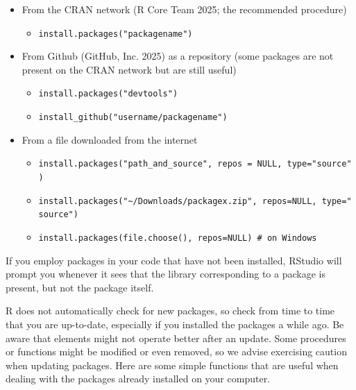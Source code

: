 \begin{itemize}
\tightlist
\item
  From the CRAN network (R Core Team 2025; the recommended procedure)

  \begin{itemize}
  \tightlist
  \item
    \texttt{install.packages("packagename")}
  \end{itemize}
\item
  From Github (GitHub, Inc. 2025) as a repository (some packages are not present on the CRAN network but are still useful)

  \begin{itemize}
  \tightlist
  \item
    \texttt{install.packages("devtools")}
  \item
    \texttt{install\_github("username/packagename")}
  \end{itemize}
\item
  From a file downloaded from the internet

  \begin{itemize}
  \tightlist
  \item
    \texttt{install.packages("path\_and\_source",\ repos\ =\ NULL,\ type="source")}
  \item
    \texttt{install.packages("\textasciitilde{}/Downloads/packagex.zip",\ repos=NULL,\ type="source")}
  \item
    \texttt{install.packages(file.choose(),\ repos=NULL)\ \#\ on\ Windows}
  \end{itemize}
\end{itemize}

If you employ packages in your code that have not been
installed, RStudio will prompt you whenever it sees that the library
corresponding to a package is present, but not the package itself.

R does not automatically check for new packages, so check from time
to time that you are up-to-date, especially if you installed the packages a while ago. Be aware that elements might not operate better
after an update. Some procedures or functions might be modified or even
removed, so we advise exercising caution when updating packages. Here
are some simple functions that are useful when dealing with the packages
already installed on your computer.

